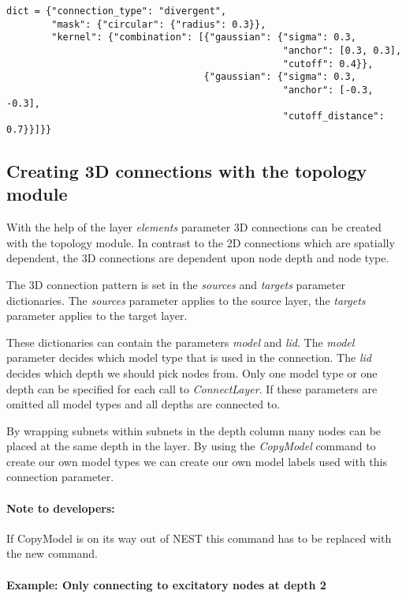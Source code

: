 \documentclass{article}
\begin{document}
\begin{verbatim}
dict = {"connection_type": "divergent",
        "mask": {"circular": {"radius": 0.3}},
        "kernel": {"combination": [{"gaussian": {"sigma": 0.3, 
                                                 "anchor": [0.3, 0.3],
                                                 "cutoff": 0.4}}, 
                                   {"gaussian": {"sigma": 0.3,
                                                 "anchor": [-0.3, -0.3],
                                                 "cutoff_distance": 0.7}}]}}
\end{verbatim}

\subsection{Creating 3D connections with the topology module}

With the help of the layer \emph{elements} parameter 3D connections can be created with the topology module. In contrast to the 2D connections which are spatially dependent, the 3D connections are dependent upon node depth and node type. 

The 3D connection pattern is set in the \emph{sources} and \emph{targets} parameter dictionaries. The \emph{sources} parameter applies to the source layer, the \emph{targets} parameter applies to the target layer. 

These dictionaries can contain the parameters \emph{model} and \emph{lid}. The \emph{model} parameter decides which model type that is used in the connection. The \emph{lid} decides which depth we should pick nodes from. Only one model type or one depth can be specified for each call to \emph{ConnectLayer}. If these parameters are omitted all model types and all depths are connected to. 

By wrapping subnets within subnets in the depth column many nodes can be placed at the same depth in the layer. By using the \emph{CopyModel} command to create our own model types we can create our own model labels used with this connection parameter.

\paragraph{Note to developers:} If CopyModel is on its way out of NEST this command has to be replaced with the new command.

\paragraph{Example: Only connecting to excitatory nodes at depth 2}
\end{document}
